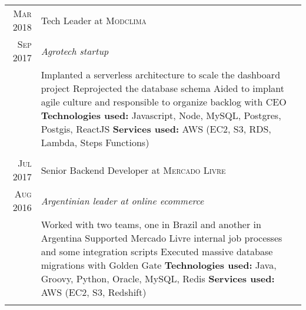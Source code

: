 \documentclass[a4paper,10pt]{article}
\begin{document}
\begin{tabular}{r|p{11cm}}
 \textsc{ Mar 2018 } & Tech Leader at \textsc{Modclima} \\\textsc{Sep 2017}&\emph{Agrotech startup }\\&\footnotesize{
  Implanted a serverless architecture to scale the dashboard project\newline
  Reprojected the database schema\newline
  Aided to implant agile culture and responsible to organize backlog with CEO\newline
\textbf{Technologies used:} Javascript, Node, MySQL, Postgres, Postgis, ReactJS\newline
\textbf{Services used:} AWS (EC2, S3, RDS, Lambda, Steps Functions)}\\\multicolumn{2}{c}{} \\

 \textsc{Jul 2017} & Senior Backend Developer at \textsc{Mercado Livre} \\\textsc{Aug 2016}&\emph{Argentinian leader at online ecommerce }\\&\footnotesize{
  Worked with two teams, one in Brazil and another in Argentina\newline
  Supported Mercado Livre internal job processes and some integration scripts\newline
  Executed massive database migrations with Golden Gate\newline
\textbf{Technologies used:} Java, Groovy, Python, Oracle, MySQL, Redis\newline
\textbf{Services used:} AWS (EC2, S3, Redshift)}\\\multicolumn{2}{c}{} \\
 
 \end{tabular}
 
\end{document}
